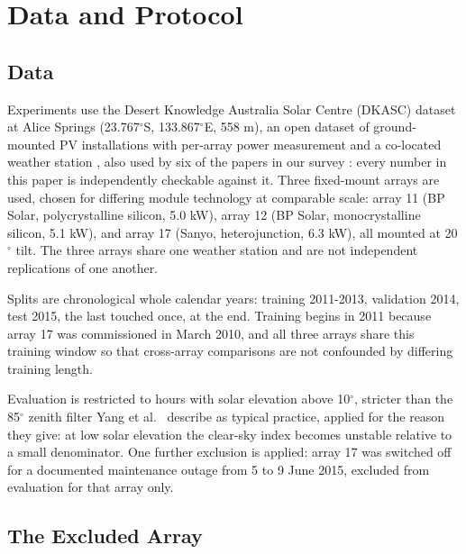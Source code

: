 \section{Data and Protocol}
\label{sec:data-protocol}

\subsection{Data}
\label{sec:data}

Experiments use the Desert Knowledge Australia Solar Centre (DKASC)
dataset at Alice Springs (23.767$^\circ$S, 133.867$^\circ$E, 558 m), an
open dataset of ground-mounted PV installations with per-array power
measurement and a co-located weather station \cite{dkasolarcentre},
also used by six of the papers in our survey
\cite{zhou2024cnnlstmattnbayes, hou2024vmdwoalstm,
ye2026distributedcnnlstm, hussain2022hybridgrucnn,
alharkan2023dsclanet, guo2024qrkddn}: every number in this paper is
independently checkable against it.
Three fixed-mount arrays are used, chosen for differing module
technology at comparable scale: array 11 (BP Solar, polycrystalline
silicon, 5.0 kW), array 12 (BP Solar, monocrystalline silicon, 5.1
kW), and array 17 (Sanyo, heterojunction, 6.3 kW), all mounted at
20$^\circ$ tilt. The three arrays share one weather station and are
not independent replications of one another.

Splits are chronological whole calendar years: training 2011-2013,
validation 2014, test 2015, the last touched once, at the end.
Training begins in 2011 because array 17 was commissioned in March
2010, and all three arrays share this training window so that
cross-array comparisons are not confounded by differing training
length.

Evaluation is restricted to hours with solar elevation above
10$^\circ$, stricter than the 85$^\circ$ zenith filter Yang et
al.~\cite{yang2020verification} describe as typical practice, applied
for the reason they give: at low solar elevation the clear-sky index
becomes unstable relative to a small denominator. One further
exclusion is applied: array 17 was switched off for a documented
maintenance outage from 5 to 9 June 2015, excluded from evaluation for
that array only.

\subsection{The Excluded Array}
\label{sec:data-excluded}

